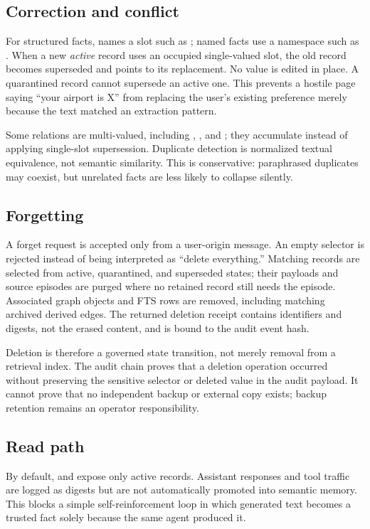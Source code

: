 \subsection{Correction and conflict}

For structured facts,  names a slot such as ; named facts use a namespace such as . When a new \emph{active} record uses an occupied single-valued slot, the old record becomes superseded and points to its replacement. No value is edited in place. A quarantined record cannot supersede an active one. This prevents a hostile page saying ``your airport is X'' from replacing the user's existing preference merely because the text matched an extraction pattern.

Some relations are multi-valued, including , , and ; they accumulate instead of applying single-slot supersession. Duplicate detection is normalized textual equivalence, not semantic similarity. This is conservative: paraphrased duplicates may coexist, but unrelated facts are less likely to collapse silently.

\subsection{Forgetting}

A forget request is accepted only from a user-origin message. An empty selector is rejected instead of being interpreted as ``delete everything.'' Matching records are selected from active, quarantined, and superseded states; their payloads and source episodes are purged where no retained record still needs the episode. Associated graph objects and FTS rows are removed, including matching archived derived edges. The returned deletion receipt contains identifiers and digests, not the erased content, and is bound to the audit event hash.

Deletion is therefore a governed state transition, not merely removal from a retrieval index. The audit chain proves that a deletion operation occurred without preserving the sensitive selector or deleted value in the audit payload. It cannot prove that no independent backup or external copy exists; backup retention remains an operator responsibility.

\subsection{Read path}

By default,  and  expose only active records. Assistant responses and tool traffic are logged as digests but are not automatically promoted into semantic memory. This blocks a simple self-reinforcement loop in which generated text becomes a trusted fact solely because the same agent produced it.
